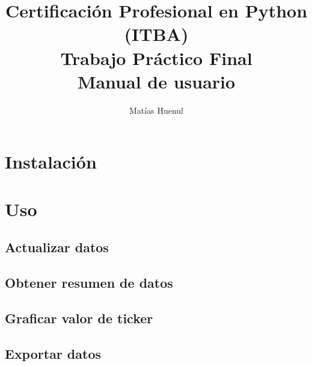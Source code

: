 \documentclass{article}
\title{Certificación Profesional en Python (ITBA) \\
Trabajo Práctico Final\\
Manual de usuario}
\author{Matías Huenul}
\date{}
\begin{document}
\maketitle
\tableofcontents
\newpage

\section{Instalación}

\section{Uso}

\subsection{Actualizar datos}

\subsection{Obtener resumen de datos}

\subsection{Graficar valor de ticker}

\subsection{Exportar datos}



\end{document}
